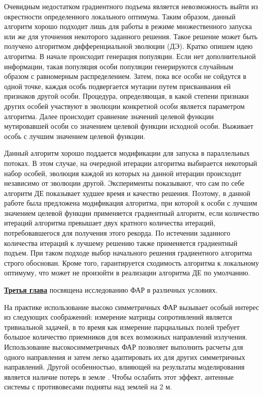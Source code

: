 Очевидным недостатком градиентного подъема является невозможность выйти из окрестности определенного локального оптимума. Таким образом, данный алгоритм хорошо подходит лишь для работы в режиме множественного запуска или же для уточнения некоторого заданного решения. Такое решение может быть получено алгоритмом дифференциальной эволюции (ДЭ).
Кратко опишем идею алгоритма. В начале происходит генерация популяции. Если нет дополнительной информации, такая популяция особи популяции генерируются случайным образом с равномерным распределением. Затем, пока все особи не сойдутся в одной точке, каждая особь подвергается мутации путем присваивания ей признаков другой особи. Процедура, определяющая, в какой степени признаки других особей участвуют в эволюции конкретной особи является параметром алгоритма. Далее происходит сравнение значений целевой функции мутировавшей особи со значением целевой функции исходной особи. Выживает особь с лучшим значением целевой функции.

Данный алгоритм хорошо поддается модификации для запуска в параллельных потоках. В этом случае, на очередной итерации алгоритма выбирается некоторый набор особей, эволюция каждой из которых на данной итерации происходит независимо от эволюции другой.
Эксперименты показывают, что сам по себе алгоритм ДЕ показывает худшее время и качество решения. Поэтому, в данной работе была предложена модификация алгоритма, при которой к особи с лучшим значением целевой функции применяется градиентный алгоритм, если количество итераций алгоритма превышает двух кратного количества итераций, потребовавшегося для получения этого рекорда. По истечении заданного количества итераций к лучшему решению также применяется градиентный подъем. При таком подходе выбор начального решения градиентного алгоритма строго обоснован. Кроме того, гарантируется сходимость алгоритма к локальному оптимуму, что может не произойти в реализации алгоритма ДЕ по умолчанию.

\underline{\textbf{Третья глава}} посвящена исследованию ФАР в различных условиях.

На практике использование высоко симметричных ФАР вызывает особый интерес из следующих соображений: измерение матрицы сопротивлений является тривиальной задачей, в то время как измерение парциальных полей требует большое количество приемников для всех возможных направлений излучения. Использование высокосимметричных ФАР позволяет выполнить расчеты для одного направления и затем легко адаптировать их для других симметричных направлений. Другой особенностью, влияющей на результаты моделирования является наличие потерь в земле \autocite{yurkov:groundloss}. Чтобы ослабить этот эффект, антенные системы с противовесами подняты над землей на 2 м.


